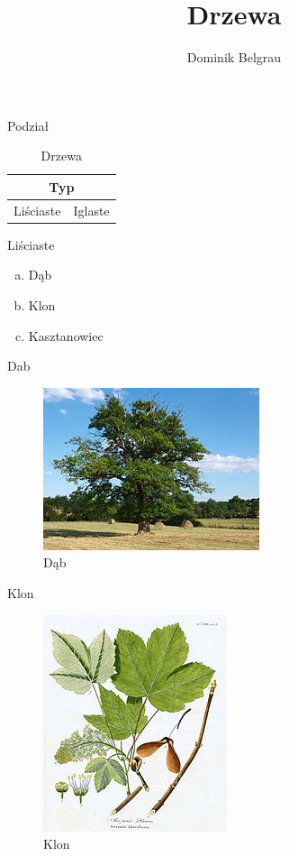 \documentclass{beamer}
\title{Drzewa}
\author{Dominik Belgrau}
\begin{document}
\begin{frame}
\titlepage
\end{frame}

\begin{frame}{Podział}
\begin{table}
\begin{center}
\begin{tabular}{ |p{3cm}|p{3cm}| }
 \hline
 \multicolumn{2}{|c|}{Typ} \\
 \hline
 Liściaste &Iglaste\\
\hline
\end{tabular}
\caption{Drzewa}
\label{t1}
\end{center}
\end{table}
\end{frame}

\begin{frame}{Liściaste}
\begin{enumerate}[a)]
\item Dąb
\pause
\item Klon
\pause
\item Kasztanowiec
\end{enumerate}
\end{frame}

\begin{frame}{Dab}
\begin{figure}[h!]
\includegraphics[scale=13]{dab.jpg}
\caption{Dąb}
\label{dab}
\end{figure}
\end{frame}

\begin{frame}{Klon}
\begin{figure}[h!]
\includegraphics[scale=2]{klon.jpg}
\caption{Klon}
\label{klo}
\end{figure}
\end{frame}
\end{document}
